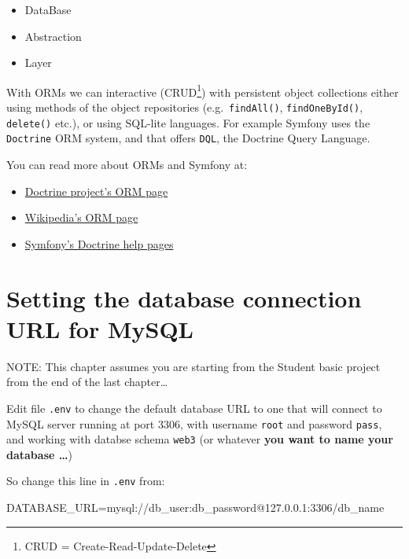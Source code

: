 \documentclass[a4paperpaper,openright]{book}
\newenvironment{Shaded}{}{}
\newcommand{\ExtensionTok}[1]{#1}
\newcommand{\NormalTok}[1]{#1}
\newcommand{\VariableTok}[1]{\textcolor[rgb]{0.10,0.09,0.49}{#1}}
\providecommand{\tightlist}{%
  \setlength{\itemsep}{0pt}\setlength{\parskip}{0pt}}
\begin{document}
\begin{itemize}
\tightlist
\item
  DataBase
\item
  Abstraction
\item
  Layer
\end{itemize}

With ORMs we can interactive (CRUD\footnote{CRUD =
  Create-Read-Update-Delete}) with persistent object collections either
using methods of the object repositories (e.g.~\texttt{findAll()},
\texttt{findOneById()}, \texttt{delete()} etc.), or using SQL-lite
languages. For example Symfony uses the \texttt{Doctrine} ORM system,
and that offers \texttt{DQL}, the Doctrine Query Language.

You can read more about ORMs and Symfony at:

\begin{itemize}
\tightlist
\item
  \href{http://www.doctrine-project.org/projects/orm.html}{Doctrine
  project's ORM page}
\item
  \href{https://en.wikipedia.org/wiki/Object-relational_mapping}{Wikipedia's
  ORM page}
\item
  \href{https://symfony.com/doc/current/doctrine.html}{Symfony's
  Doctrine help pages}
\end{itemize}

\hypertarget{setting-the-database-connection-url-for-mysql}{%
\section{Setting the database connection URL for
MySQL}\label{setting-the-database-connection-url-for-mysql}}

NOTE: This chapter assumes you are starting from the Student basic
project from the end of the last chapter\ldots{}

Edit file \texttt{.env} to change the default database URL to one that
will connect to MySQL server running at port 3306, with username
\texttt{root} and password \texttt{pass}, and working with databse
schema \texttt{web3} (or whatever \textbf{you want to name your database
\ldots{}})

So change this line in \texttt{.env} from:

\begin{Shaded}
\begin{Highlighting}[]
    \VariableTok{DATABASE_URL=}\NormalTok{mysql://db_user:db_password}\ExtensionTok{@127.0.0.1}\NormalTok{:3306/db_name}
\end{Highlighting}
\end{Shaded}
\end{document}
